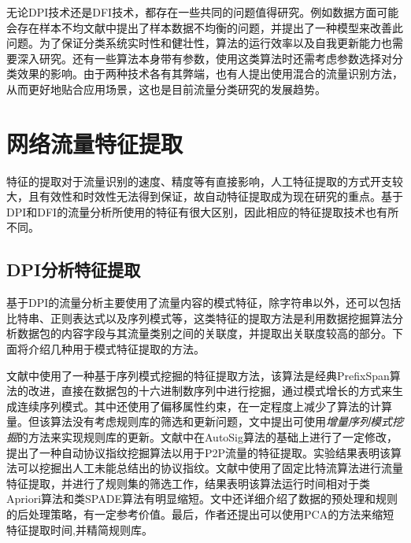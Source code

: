 \documentclass[a4papper]{article}
\begin{document}
\par\setlength{\parindent}{2em} %
无论DPI技术还是DFI技术，都存在一些共同的问题值得研究。例如数据方面可能会存在样本不均文献\cite{彭立志2015基于机器学习的流量识别关键技术研究}中提出了样本数据不均衡的问题，并提出了一种模型来改善此问题。为了保证分类系统实时性和健壮性，算法的运行效率以及自我更新能力也需要深入研究。还有一些算法本身带有参数，使用这类算法时还需考虑参数选择对分类效果的影响。由于两种技术各有其弊端，也有人提出使用混合的流量识别方法，从而更好地贴合应用场景，这也是目前流量分类研究的发展趋势。
\section{网络流量特征提取}
\par\setlength{\parindent}{2em} %
特征的提取对于流量识别的速度、精度等有直接影响，人工特征提取的方式开支较大，且有效性和时效性无法得到保证，故自动特征提取成为现在研究的重点。基于DPI和DFI的流量分析所使用的特征有很大区别，因此相应的特征提取技术也有所不同。
\subsection{DPI分析特征提取}
\par\setlength{\parindent}{2em} %
基于DPI的流量分析主要使用了流量内容的模式特征，除字符串以外，还可以包括比特串、正则表达式以及序列模式等，这类特征的提取方法是利用数据挖掘算法分析数据包的内容字段与其流量类别之间的关联度，并提取出关联度较高的部分。下面将介绍几种用于模式特征提取的方法。
\par\setlength{\parindent}{2em} %
文献\cite{林冠洲2011网络流量识别关键技术研究}中使用了一种基于序列模式挖掘的特征提取方法，该算法是经典PrefixSpan算法的改进，直接在数据包的十六进制数序列中进行挖掘，通过模式增长的方式来生成连续序列模式。其中还使用了偏移属性约束，在一定程度上减少了算法的计算量。但该算法没有考虑规则库的筛选和更新问题，文中提出可使用\emph{增量序列模式挖掘}的方法来实现规则库的更新。文献\cite{马婧2012网络流量特征提取与流量识别研究}中在AutoSig算法的基础上进行了一定修改，提出了一种自动协议指纹挖掘算法以用于P2P流量的特征提取。实验结果表明该算法可以挖掘出人工未能总结出的协议指纹。文献\cite{牟澄2014互联网流量特征智能提取关键技术研究}中使用了固定比特流算法进行流量特征提取，并进行了规则集的筛选工作，结果表明该算法运行时间相对于类Apriori算法和类SPADE算法有明显缩短。文中还详细介绍了数据的预处理和规则的后处理策略，有一定参考价值。最后，作者还提出可以使用PCA的方法来缩短特征提取时间,并精简规则库。
\end{document}
